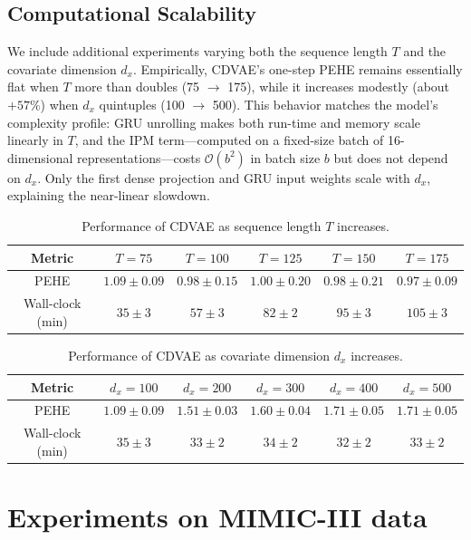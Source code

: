 \documentclass[10pt]{article} %
\begin{document}
\subsection{Computational Scalability}
\label{appendix:arsim_comput_scalability}
We include additional experiments varying both the sequence length $T$ and the covariate dimension $d_x$. 
Empirically, CDVAE’s one-step PEHE remains essentially flat when $T$ more than doubles (75 $\rightarrow$ 175), 
while it increases modestly (about $+57\%$) when $d_x$ quintuples (100 $\rightarrow$ 500). 
This behavior matches the model’s complexity profile: GRU unrolling makes both run-time and memory scale linearly in $T$, 
and the IPM term---computed on a fixed-size batch of 16-dimensional representations---costs $\mathcal{O}(b^2)$ in batch size $b$ 
but does not depend on $d_x$. Only the first dense projection and GRU input weights scale with $d_x$, explaining the near-linear slowdown.

\begin{table}[h!]
\centering
\begin{tabular}{c c c c c c}
\toprule
Metric & $T=75$ & $T=100$ & $T=125$ & $T=150$ & $T=175$ \\
\midrule
PEHE & $1.09 \pm 0.09$ & $0.98 \pm 0.15$ & $1.00 \pm 0.20$ & $0.98 \pm 0.21$ & $0.97 \pm 0.09$ \\
Wall-clock (min) & $35 \pm 3$ & $57 \pm 3$ & $82 \pm 2$ & $95 \pm 3$ & $105 \pm 3$ \\
\bottomrule
\end{tabular}
\caption{Performance of CDVAE as sequence length $T$ increases.}
\label{tab:scalability-sequence}
\end{table}

\begin{table}[h!]
\centering
\begin{tabular}{c c c c c c}
\toprule
Metric & $d_x=100$ & $d_x=200$ & $d_x=300$ & $d_x=400$ & $d_x=500$ \\
\midrule
PEHE & $1.09 \pm 0.09$ & $1.51 \pm 0.03$ & $1.60 \pm 0.04$ & $1.71 \pm 0.05$ & $1.71 \pm 0.05$ \\
Wall-clock (min) & $35 \pm 3$ & $33 \pm 2$ & $34 \pm 2$ & $32 \pm 2$ & $33 \pm 2$ \\
\bottomrule
\end{tabular}
\caption{Performance of CDVAE as covariate dimension $d_x$ increases.}
\label{tab:scalability-covariates}
\end{table}

\section{Experiments on MIMIC-III data}
\end{document}
